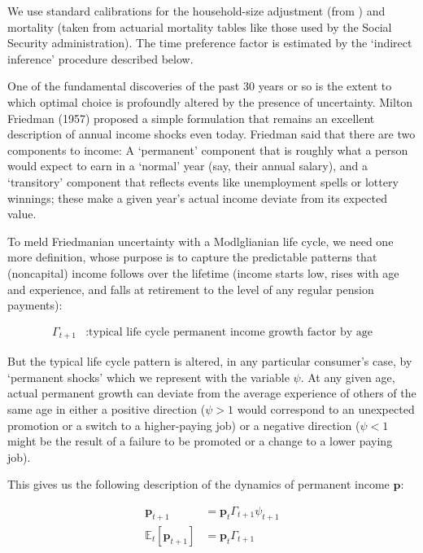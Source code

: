 \documentclass{article}
\newcommand{\pLvl}{\mathbf{p}}
\newcommand{\Ex}{\mathbb{E}}
\newcommand{\permGroFac}{\Gamma}
\newcommand{\permShk}{\psi}
\begin{document}
We use standard calibrations for the household-size adjustment (from \cite{Cagetti_2003}) and mortality (taken from actuarial mortality tables like those used by the Social Security administration). The time preference factor is estimated by the `indirect inference' procedure described below.

One of the fundamental discoveries of the past 30 years or so is the extent to which optimal choice is profoundly altered by the presence of uncertainty. Milton Friedman (1957) proposed a simple formulation that remains an excellent description of annual income shocks even today. Friedman said that there are two components to income: A `permanent' component that is roughly what a person would expect to earn in a `normal' year (say, their annual salary), and a `transitory' component that reflects events like unemployment spells or lottery winnings; these make a given year's actual income deviate from its expected value.

To meld Friedmanian uncertainty with a Modlglianian life cycle, we need one more definition, whose purpose is to capture the predictable patterns that (noncapital) income follows over the lifetime (income starts low, rises with age and experience, and falls at retirement to the level of any regular pension payments):

\begin{equation}
\begin{align}
    \permGroFac_{t+1} & : \text{typical life cycle permanent income growth factor by age}
\end{align}
\end{equation}

But the typical life cycle pattern is altered, in any particular consumer's case, by `permanent shocks' which we represent with the variable $\permShk$. At any given age, actual permanent growth can deviate from the average experience of others of the same age in either a positive direction ($\psi>1$ would correspond to an unexpected promotion or a switch to a higher-paying job) or a negative direction ($\psi < 1$ might be the result of a failure to be promoted or a change to a lower paying job).

This gives us the following description of the dynamics of permanent income $\pLvl$:

\begin{equation}
\begin{align}
    \pLvl_{t+1} & = \pLvl_{t} \permGroFac_{t+1} \permShk_{t+1}
    \\ \Ex_{t}[\pLvl_{t+1}] & = \pLvl_{t} \permGroFac_{t+1}
\end{align}
\end{equation}
\end{document}
